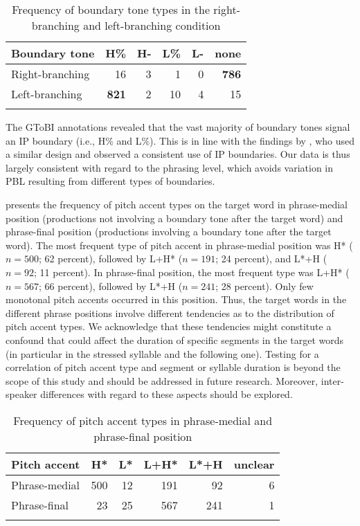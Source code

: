 \documentclass[output=paper]{langscibook}
\begin{document}
\begin{table}
    \caption{Frequency of boundary tone types in the right-branching and left-branching condition\label{tab:Tab1}}
    \begin{tabular}{lrrrrr}
    \lsptoprule
    Boundary tone & H\% & H- & L\% & L- & none \\
    \midrule
    Right-branching & 16 & 3 & 1 & 0 & \textbf{786} \\
    Left-branching & \textbf{821} & 2 & 10 & 4 & 15 \\
    \lspbottomrule
    \end{tabular}
\end{table}

The GToBI annotations revealed that the vast majority of boundary tones signal an IP boundary (i.e., H\% and L\%). This is in line with the findings by \citet{PetroneEtal2017}, who used a similar design and observed a consistent use of IP boundaries. Our data is thus largely consistent with regard to the phrasing level, which avoids variation in PBL resulting from different types of boundaries.\largerpage

 presents the frequency of pitch accent types on the target word in phrase-medial position (productions not involving a boundary tone after the target word) and phrase-final position (productions involving a boundary tone after the target word). The most frequent type of pitch accent in phrase-medial position was H* ($n=500$; 62 percent), followed by L+H* ($n=191$; 24 percent), and L*+H ($n=92$; 11 percent). In phrase-final position, the most frequent type was L+H* ($n=567$; 66 percent), followed by L*+H ($n=241$; 28 percent). Only few monotonal pitch accents occurred in this position. Thus, the target words in the different phrase positions involve different tendencies as to the distribution of pitch accent types. We acknowledge that these tendencies might constitute a confound that could affect the duration of specific segments in the target words (in particular in the stressed syllable and the following one). Testing for a correlation of pitch accent type and segment or syllable duration is beyond the scope of this study and should be addressed in future research. Moreover, inter-speaker differences with regard to these aspects should be explored.

\begin{table}
    \caption{Frequency of pitch accent types in phrase-medial and phrase-final position\label{tab:Tab2}}
    \begin{tabular}{lrrrrr}
    \lsptoprule
    Pitch accent & H* & L* & L+H* & L*+H & unclear\\
    \midrule
    Phrase-medial & 500 & 12 & 191 & 92 & 6 \\
    Phrase-final & 23 & 25 & 567 & 241 & 1 \\
    \lspbottomrule
    \end{tabular}
\end{table}
    
\end{document}
